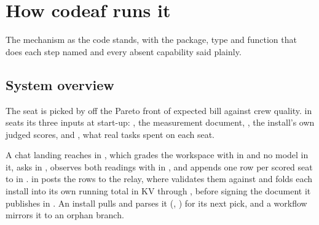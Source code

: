 \section{How codeaf runs it}
\label{app:engineering}

The mechanism as the code stands, with the package, type and function that does
each step named and every absent capability said plainly.

\subsection{System overview}
\label{app:overview}

The seat is picked by  off the Pareto front of expected
bill against crew quality.  in 
seats its three inputs at start-up: , the measurement
document, , the install's own judged scores, and
, what real tasks spent on each seat.

A chat landing reaches  in ,
which grades the workspace with  in 
and no model in it, asks  in ,
observes both readings with  in ,
and appends one row per scored seat to  in
.  in
 posts the rows to the relay, where
 validates them against  and
folds each install into its own running total in KV through
, before signing the document it publishes in
. An install pulls and parses it (,
) for its next pick, and a workflow mirrors it to an
orphan branch.

